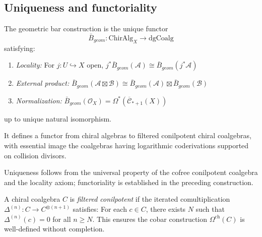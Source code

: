 \subsection{Uniqueness and functoriality}

\begin{theorem}\label{thm:bar-uniqueness-functoriality}
The geometric bar construction is the unique functor
\[\bar{B}_{geom}: \text{ChirAlg}_X \to \text{dgCoalg}\]
satisfying:
\begin{enumerate}
\item \emph{Locality:} For $j: U \hookrightarrow X$ open, $j^*\bar{B}_{geom}(\mathcal{A}) \cong \bar{B}_{geom}(j^*\mathcal{A})$
\item \emph{External product:} $\bar{B}_{geom}(\mathcal{A} \boxtimes \mathcal{B}) \cong \bar{B}_{geom}(\mathcal{A}) \boxtimes \bar{B}_{geom}(\mathcal{B})$
\item \emph{Normalization:} $\bar{B}_{geom}(\mathcal{O}_X) = \Omega^*(\overline{\mathcal{C}}_{*+1}(X))$
\end{enumerate}
up to unique natural isomorphism.

It defines a functor from chiral algebras to filtered conilpotent chiral coalgebras, with essential image the coalgebras having logarithmic coderivations supported on collision divisors.
\end{theorem}

Uniqueness follows from the universal property of the cofree conilpotent coalgebra and the locality axiom; functoriality is established in the preceding construction.

\begin{definition}\label{def:conilpotent-chiral-coalgebra}
A chiral coalgebra $C$ is \emph{filtered conilpotent} if the iterated comultiplication
$\Delta^{(n)} : C \to C^{\otimes(n+1)}$ satisfies: For each $c \in C$, there exists
$N$ such that $\Delta^{(n)}(c) = 0$ for all $n \geq N$. This ensures the cobar
construction $\Omega^{\text{ch}}(C)$ is well-defined without completion.
\end{definition}



